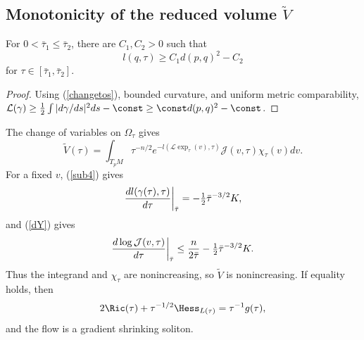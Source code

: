 \subsection{Monotonicity of the reduced volume $\widetilde V$} \label{monoV}
\begin{lemma}
  \label{lem:kl-monotonicity-reduced-volume-estimates-reduced-volume}
  \label{lowerbound}
For $0<\bar\tau_1\le\bar\tau_2$, there are $C_1,C_2>0$ such that
\begin{equation}\label{lbound}l(q,\tau)\ge C_1d(p,q)^2-C_2\end{equation}
for $\tau\in[\bar\tau_1,\bar\tau_2]$.
\end{lemma}
\begin{proof}
\sketch
Using (\ref{changetos}), bounded curvature, and uniform metric comparability,
${\mathcal L}(\gamma)\ge\frac12\int|d\gamma/ds|^2ds-\const\ge\const d(p,q)^2-\const$.
\end{proof}

The change of variables on $\Omega_\tau$ gives
\begin{equation}
\tilde V(\tau)=\int_{T_pM}\tau^{-n/2}e^{-l({\mathcal L}\exp_\tau(v),\tau)}
{\mathcal J}(v,\tau)\chi_\tau(v)dv.
\end{equation}
For a fixed $v$, (\ref{sub4}) gives
\begin{equation}\label{bbound1}{dl(\gamma(\tau),\tau)\over d\tau}\bigg|_{\bar\tau}=-\tfrac12\bar\tau^{-3/2}K,
\end{equation}
and (\ref{dY}) gives
\begin{equation}\label{bbound2}{d\log{\mathcal J}(v,\tau)\over d\tau}\bigg|_{\bar\tau}
\le {n\over2\bar\tau}-\tfrac12\bar\tau^{-3/2}K.
\end{equation}
Thus the integrand and $\chi_\tau$ are nonincreasing, so $\tilde V$ is nonincreasing.
If equality holds, then
\begin{equation}2\Ric(\tau)+\tau^{-1/2}\Hess_{L(\tau)}=\tau^{-1}g(\tau),\end{equation}
and the flow is a gradient shrinking soliton.

